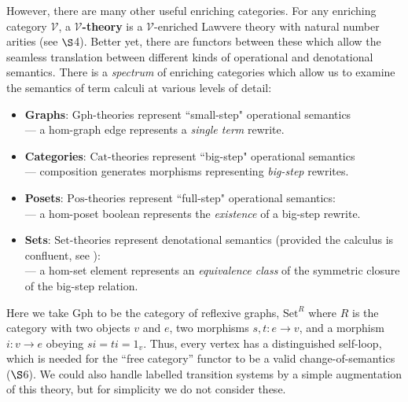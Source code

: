 \documentclass{amsart}
\theoremstyle{definition}
\newcommand{\Gph}{\mathrm{Gph}}
\newcommand{\Set}{\mathrm{Set}}
\newcommand{\Cat}{\mathrm{Cat}}
\newcommand{\Pos}{\mathrm{Pos}}
\newcommand{\V}{\mathscr{V}}
\newcommand{\maps}{\colon}
\begin{document}
However, there are many other useful enriching categories.  For any enriching category $\V$, a \textbf{$\V$-theory} is a $\V$-enriched Lawvere theory with natural number arities (see $\S$4). Better yet, there are functors between these which allow the seamless translation between different kinds of operational and denotational semantics.  There is a \textit{spectrum} of enriching categories which allow us to examine the semantics of term calculi at various levels of detail:

\begin{itemize}
\item 
\textbf{Graphs}: $\Gph$-theories represent ``small-step" operational semantics \\ --- a hom-graph edge represents a \textit{single term} rewrite.
\item
\textbf{Categories}: $\Cat$-theories represent ``big-step" operational semantics\\ --- composition 
generates morphisms representing \textit{big-step} rewrites.
\item
\textbf{Posets}: $\Pos$-theories represent ``full-step" operational semantics:\\ --- a hom-poset boolean represents the \textit{existence} of a big-step rewrite.
\item
\textbf{Sets}: $\Set$-theories represent denotational semantics (provided the calculus is confluent, see \cite{lam}):\\ --- a hom-set element represents an \textit{equivalence class} of the symmetric closure of the big-step relation.
\end{itemize}
Here we take $\Gph$ to be the category of reflexive graphs, $\Set^R$ where $R$ is the category with two objects $v$ and $e$, two morphisms $s,t \maps e \to v$, and a morphism $i \maps v \to e$ obeying $si = ti = 1_v$.  Thus, every vertex has a distinguished self-loop, which is needed for the ``free category'' functor to be a valid change-of-semantics ($\S$6).   We could also handle labelled transition systems by a simple augmentation of this theory, but for simplicity we do not consider these.

\end{document}

